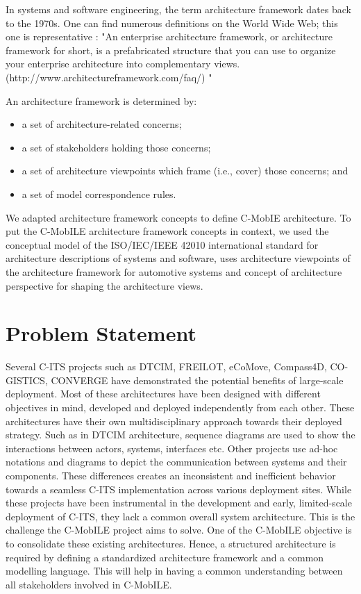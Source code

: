\documentclass[letterpaper, 10 pt, conference]{ieeeconf}  %
\begin{document}
In systems and software engineering, the term architecture framework dates back to the 1970s. One can find numerous definitions on the World Wide Web; this one is representative \cite{zachman1} :
"An enterprise architecture framework, or architecture framework for short, is a prefabricated structure that you can use to organize your enterprise architecture into complementary views. (http://www.architectureframework.com/faq/) "

An architecture framework is determined by:
\begin{itemize}
	\item a set of architecture-related concerns;
	\item a set of stakeholders holding those concerns;
	\item a set of architecture viewpoints which frame (i.e., cover) those concerns; and
	\item a set of model correspondence rules.
\end{itemize}
We adapted architecture framework concepts to define C-MobIE architecture. To put the C-MobILE architecture framework concepts in context, we used the conceptual model of the ISO/IEC/IEEE 42010 international standard for architecture descriptions of systems and software\cite{arch_framework}, uses architecture viewpoints of the architecture framework for automotive systems\cite{yd} and concept of architecture perspective for shaping the architecture views\cite{woods}.


\section{Problem Statement}

Several C-ITS projects such as DTCIM, FREILOT, eCoMove, Compass4D, CO-GISTICS, CONVERGE have demonstrated the potential benefits of large-scale deployment. Most of these architectures have been designed with different objectives in mind, developed and deployed independently from each other. These architectures have their own multidisciplinary approach towards their deployed strategy. Such as in DTCIM architecture, sequence diagrams are used to show the interactions between actors, systems, interfaces etc. Other projects use ad-hoc notations and diagrams to depict the communication between systems and their components. These differences creates an inconsistent and inefficient behavior towards a seamless C-ITS implementation across various deployment sites. While these projects have been instrumental in the development and early, limited-scale deployment of C-ITS, they lack a common overall system architecture. This is the challenge the C-MobILE project aims to solve. One of the C-MobILE objective is to consolidate these existing architectures. Hence, a structured architecture is required by defining a standardized architecture framework and a common modelling language. This will help in having a common understanding between all stakeholders involved in C-MobILE.
\end{document}
